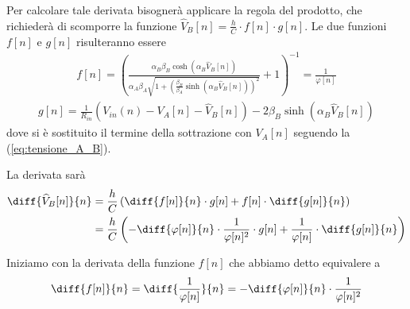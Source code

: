 		Per calcolare tale derivata bisognerà applicare la regola del prodotto, che richiederà di scomporre la funzione $\widehat V_{B}[n] = \frac{h}{C}\cdot f[n]\cdot g[n]$.
		Le due funzioni $f[n]$ e $g[n]$ risulteranno essere
		\begin{equation}
			\begin{split}
				f[n] = \left(\frac{\alpha_{B}\beta_{B}\cosh(\alpha_{B}\widehat V_{B}[n])}{\alpha_{A}\beta_{A}\sqrt{1+\left(\frac{\beta_{B}}{\beta_{A}}\sinh(\alpha_{B}\widehat V_{B}[n])\right)^{2}}}+1\right)^{-1} = \frac{1}{\varphi[n]}
			\end{split}
		\end{equation}
		\begin{equation}
			\begin{split}
				g[n] = \frac{1}{R_{in}}\left(V_{in}(n)-V_{A}[n]-\widehat V_{B}[n]\right)-2\beta_{B}\sinh(\alpha_{B}\widehat V_{B}[n])
			\end{split}
		\end{equation}
		dove si è sostituito il termine della sottrazione con $V_{A}[n]$ seguendo la (\ref{eq:tensione_A_B}).

		La derivata sarà
		\begin{equation}
			\label{eq:jacobiano}
			\begin{split}
				\diff{\widehat V_{B}[n]}{n} &= \frac{h}{C}\left(\diff{f[n]}{n}\cdot g[n]+f[n]\cdot \diff{g[n]}{n}\right)\\
				&= \frac{h}{C}\left(-\diff{\varphi[n]}{n}\cdot\frac{1}{\varphi[n]^{2}}\cdot g[n]+\frac{1}{\varphi[n]}\cdot \diff{g[n]}{n}\right)
			\end{split}
		\end{equation}

		Iniziamo con la derivata della funzione $f[n]$ che abbiamo detto equivalere a
		\begin{equation}
			\label{eq:jacobiano}
			\begin{split}
				\diff{f[n]}{n} = \diff{\frac{1}{\varphi[n]}}{n} = -\diff{\varphi[n]}{n}\cdot\frac{1}{\varphi[n]^{2}}
			\end{split}
		\end{equation}

